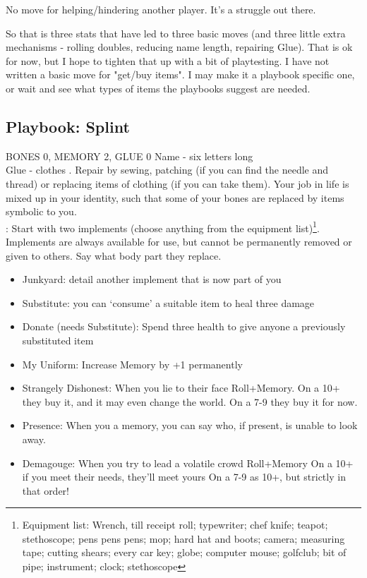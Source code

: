  No move for helping/hindering another player. It's a struggle out there. 

So that is three stats that have led to three basic moves (and three little extra mechanisms - rolling doubles, reducing name length, repairing Glue). That is ok for now, but I hope to tighten that up with a bit of playtesting. I have not written a basic move for "get/buy items". I may make it a playbook specific one, or wait and see what types of items the playbooks suggest are needed. 

\newpage
\subsection{Playbook: Splint}
BONES 0, MEMORY 2, GLUE 0  
Name - six letters long
\\ Glue - clothes . Repair by sewing, patching (if you can find the needle and thread) or replacing items of clothing (if you can take them). 		
Your job in life is mixed up in your identity, such that some of your bones are replaced by items symbolic to you. 
\\
: Start with two implements (choose anything from the equipment list)\footnote{Equipment list: Wrench, till receipt roll; typewriter; chef knife; teapot; stethoscope; pens pens pens; mop; hard hat and boots; camera; measuring tape; cutting shears; every car key; globe; computer mouse; golfclub; bit of pipe; instrument; clock; stethoscope}. Implements are always available for use, but cannot be permanently removed or given to others. Say what body part they replace.
\begin{itemize}
\item  Junkyard: detail another implement that is now part of you
\item  Substitute: you can `consume' a suitable item to heal three damage
\item  Donate (needs Substitute): Spend three health to give anyone a previously substituted item
\item My Uniform: Increase Memory by +1 permanently
\item  Strangely Dishonest: When you lie to their face Roll+Memory. 
\myitem On a 10+ they buy it, and it may even change the world. 
\myitemend On a 7-9 they buy it for now.
\item Presence: When you  a memory, you can say who, if present, is unable to look away. 
\item Demagouge: When you try to lead a volatile crowd Roll+Memory
\myitem On a 10+ if you meet their needs, they'll meet yours
\myitemend On a 7-9 as 10+, but strictly in that order!
\end{itemize}


